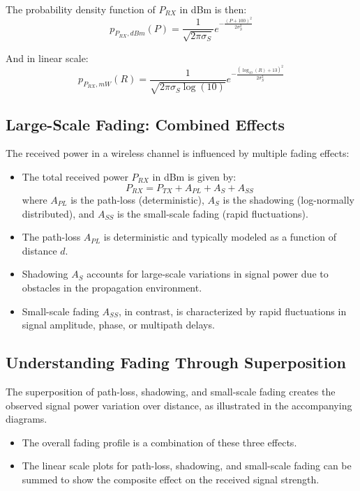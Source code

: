 The probability density function of \( P_{RX} \) in dBm is then:
\[
p_{P_{RX},dBm}(P) = \frac{1}{\sqrt{2\pi\sigma_S}} e^{-\frac{(P + 100)^2}{2\sigma_S^2}}
\]

And in linear scale:
\[
p_{P_{RX},mW}(R) = \frac{1}{\sqrt{2\pi\sigma_S \log(10)}} e^{-\frac{(\log_{10}(R) + 13)^2}{2\sigma_S^2}}
\]


\subsection*{Large-Scale Fading: Combined Effects}

The received power in a wireless channel is influenced by multiple fading effects:

\begin{itemize}
    \item The total received power \( P_{RX} \) in dBm is given by:
    \[
    P_{RX} = P_{TX} + A_{PL} + A_{S} + A_{SS}
    \]
    where \( A_{PL} \) is the path-loss (deterministic), \( A_{S} \) is the shadowing (log-normally distributed), and \( A_{SS} \) is the small-scale fading (rapid fluctuations).

    \item The path-loss \( A_{PL} \) is deterministic and typically modeled as a function of distance \( d \).

    \item Shadowing \( A_{S} \) accounts for large-scale variations in signal power due to obstacles in the propagation environment.

    \item Small-scale fading \( A_{SS} \), in contrast, is characterized by rapid fluctuations in signal amplitude, phase, or multipath delays.
\end{itemize}
\subsection*{Understanding Fading Through Superposition}

The superposition of path-loss, shadowing, and small-scale fading creates the observed signal power variation over distance, as illustrated in the accompanying diagrams.

\begin{itemize}
    \item The overall fading profile is a combination of these three effects.
    \item The linear scale plots for path-loss, shadowing, and small-scale fading can be summed to show the composite effect on the received signal strength.
\end{itemize}

